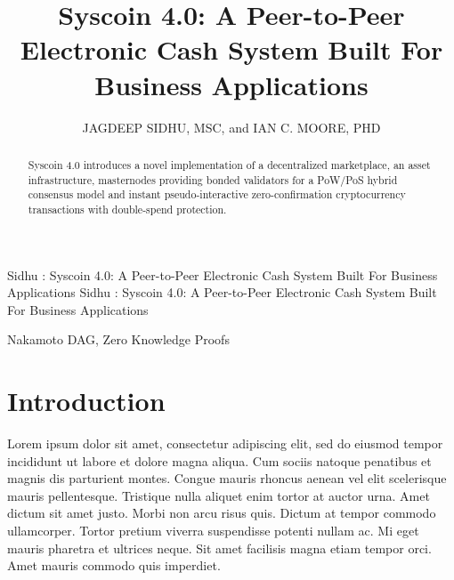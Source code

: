 \documentclass[peerreview]{ieeesyscoin}
\begin{document}
\linenumbers
\history{}

\title{\centering Syscoin 4.0: A Peer-to-Peer Electronic Cash System Built For Business Applications}
\author{\centering  \uppercase{Jagdeep Sidhu, MSc}, 
and \uppercase{Ian C. Moore, PhD}}

\address[1]{\centering Syscoin Core Developer, Blockchain Foundry Inc.(e-mail: jsidhu@blockchainfoundry.co)}
\address[2]{\centering  (e-mail: ic3moore@gmail.com)}
\tfootnote{}

\markboth
{Sidhu \headeretal: Syscoin 4.0: A Peer-to-Peer Electronic Cash System Built For Business Applications}
{Sidhu \headeretal: Syscoin 4.0: A Peer-to-Peer Electronic Cash System Built For Business Applications}

\corresp{}

\begin{abstract}
Syscoin 4.0 introduces a novel implementation of a decentralized marketplace, an asset infrastructure, masternodes providing bonded validators for a PoW/PoS hybrid consensus model and instant pseudo-interactive zero-confirmation cryptocurrency transactions with double-spend protection.
\end{abstract}

\begin{keywords}
Nakamoto DAG, Zero Knowledge Proofs
\end{keywords}

\titlepgskip=-15pt

\maketitle

\section{Introduction}
\label{sec:introduction}
Lorem ipsum dolor sit amet, consectetur adipiscing elit, sed do eiusmod tempor incididunt ut labore et dolore magna aliqua. Cum sociis natoque penatibus et magnis dis parturient montes. Congue mauris rhoncus aenean vel elit scelerisque mauris pellentesque. Tristique nulla aliquet enim tortor at auctor urna. Amet dictum sit amet justo. Morbi non arcu risus quis. Dictum at tempor commodo ullamcorper. Tortor pretium viverra suspendisse potenti nullam ac. Mi eget mauris pharetra et ultrices neque. Sit amet facilisis magna etiam tempor orci. Amet mauris commodo quis imperdiet.
\end{document}
